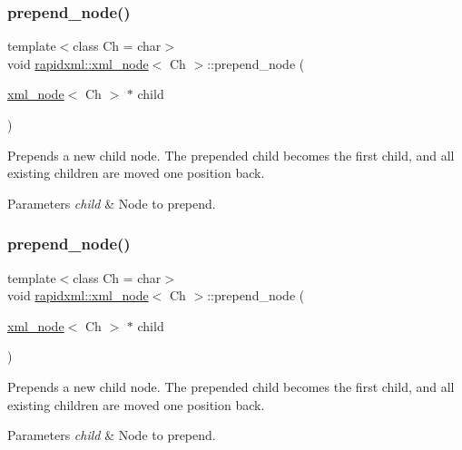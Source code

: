 \subsubsection{\texorpdfstring{prepend\+\_\+node()}{prepend\_node()}\hspace{0.1cm}{\footnotesize\ttfamily [1/2]}}
{\footnotesize\ttfamily template$<$class Ch = char$>$ \\
void \mbox{\hyperlink{classrapidxml_1_1xml__node}{rapidxml\+::xml\+\_\+node}}$<$ Ch $>$\+::prepend\+\_\+node (\begin{DoxyParamCaption}\item[{\mbox{\hyperlink{classrapidxml_1_1xml__node}{xml\+\_\+node}}$<$ Ch $>$ $\ast$}]{child }\end{DoxyParamCaption})\hspace{0.3cm}{\ttfamily [inline]}}

Prepends a new child node. The prepended child becomes the first child, and all existing children are moved one position back. 
\begin{DoxyParams}{Parameters}
{\em child} & Node to prepend. \\
\hline
\end{DoxyParams}
\mbox{\label{classrapidxml_1_1xml__node_ae86e92908c3eab40bbed8216e4f3f3cb}} 
\subsubsection{\texorpdfstring{prepend\+\_\+node()}{prepend\_node()}\hspace{0.1cm}{\footnotesize\ttfamily [2/2]}}
{\footnotesize\ttfamily template$<$class Ch = char$>$ \\
void \mbox{\hyperlink{classrapidxml_1_1xml__node}{rapidxml\+::xml\+\_\+node}}$<$ Ch $>$\+::prepend\+\_\+node (\begin{DoxyParamCaption}\item[{\mbox{\hyperlink{classrapidxml_1_1xml__node}{xml\+\_\+node}}$<$ Ch $>$ $\ast$}]{child }\end{DoxyParamCaption})\hspace{0.3cm}{\ttfamily [inline]}}

Prepends a new child node. The prepended child becomes the first child, and all existing children are moved one position back. 
\begin{DoxyParams}{Parameters}
{\em child} & Node to prepend. \\
\hline
\end{DoxyParams}
\mbox{\label{classrapidxml_1_1xml__node_aebcc42042ded78fb7020e2783f7d5426}} 
